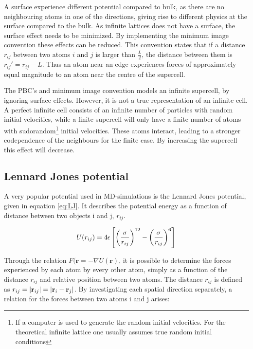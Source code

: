 A surface experience different potential compared to bulk, as there are no neighbouring atoms in one of the directions, giving rise to different physics at the surface compared to the bulk. As infinite lattices does not have a surface, the surface effect needs to be minimized. By implementing the minimum image convention these effects can be reduced. This convention states that if a distance $ r_{ij} $ between two atoms $ i $ and $ j $ is larger than $ \frac{L}{2} $, the distance between them is $  r_{ij}'  = r_{ij}-L$. Thus an atom  near an edge experiences forces of approximately equal magnitude to an atom near the centre of the supercell. 

The PBC's and minimum image convention models an infinite supercell, by ignoring surface effects. However, it is not a true representation of an infinite cell. A perfect infinite cell consists of an infinite number of particles with random initial velocities, while a finite supercell will only have a finite number of atoms with sudorandom\footnote{If a computer is used to generate the random initial velocities. For the theoretical infinite lattice one usually assumes true random initial conditions} initial velocities. These atoms interact, leading to a stronger codependence of the neighbours for the finite case. By increasing the supercell this effect will decrease.   
 	
 



\subsection{Lennard Jones potential \label{sec:LJ}}

A very popular potential used in MD-simulations is the Lennard Jones potential, given in equation \ref{eq:LJ}. It describes the potential energy as a function of distance between two objects i and j, $ r_{ij} $. 

\begin{equation}\label{eq:LJ}
	U(r_{ij}) = 4\epsilon \left[	\left(\frac{\sigma}{r_{ij}}	\right)^{12}		- \left(\frac{\sigma}{r_{ij}}	\right)^{6}				\right]\\
\end{equation}




Through the relation $ 	F (\textbf{r} = -\nabla U(\textbf{r}) $, it is possible to determine the forces experienced by each atom by every other atom, simply as a function of the distance $ r_{ij} $ and relative position between two atoms. The distance $ r_{ij} $ is defined as  $ r_{ij}  = \abs{\textbf{r}_{ij}} = \abs{\textbf{r}_i - \textbf{r}_j} 	 $. By investigating each spatial direction separately, a relation for the forces between two atoms i and j arises: 

